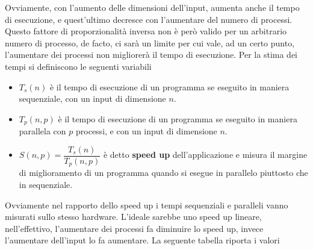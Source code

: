 \documentclass[10pt, letterpaper]{report}
\begin{document}
Ovviamente, con l'aumento delle dimensioni dell'input, aumenta anche il tempo di esecuzione, e quest'ultimo 
decresce con l'aumentare del numero di processi. Questo fattore di proporzionalità inversa non è però 
valido per un arbitrario numero di processo, de facto, ci sarà un limite per cui vale, ad un certo punto, 
l'aumentare dei processi non migliorerà il tempo di esecuzione. Per la stima dei tempi si definiscono le 
seguenti variabili \begin{itemize}
    \item $T_s(n)$ è il tempo di esecuzione di un programma se eseguito in maniera sequenziale, con un 
    input di dimensione $n$. 
    \item $T_p(n,p)$ è il tempo di esecuzione di un programma se eseguito in maniera parallela con $p$ processi,
    e con un 
    input di dimensione $n$. 
    \item $S(n,p)=\dfrac{T_s(n)}{T_p(n,p)}$ è detto \textbf{speed up} dell'applicazione e misura il margine di 
    miglioramento di un programma quando si esegue in parallelo piuttosto che in sequenziale.
\end{itemize}
Ovviamente nel rapporto dello speed up i tempi sequenziali e paralleli vanno misurati sullo stesso 
hardware. L'ideale sarebbe uno speed up lineare, nell'effettivo, l'aumentare dei processi 
fa diminuire lo speed up, invece l'aumentare dell'input lo fa aumentare. La seguente tabella riporta i valori 
\end{document}

